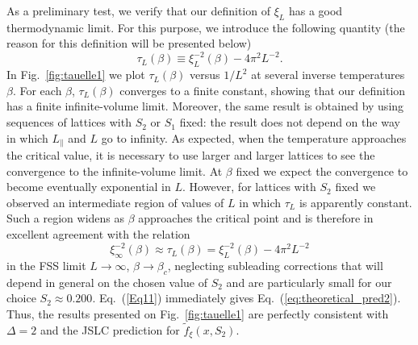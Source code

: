 \documentclass[aps,prl,twocolumn,floatfix,amssymb]{revtex4}
\newcommand{\pa}[1]{#1_{\|}}
\begin{document}
As a preliminary test, we verify that our definition of $\xi_{L}$ has a good 
thermodynamic limit. For this purpose, 
we introduce the following quantity (the reason for this definition 
will be presented below) 
\begin{equation} 
 \label{eq:definition_of_tauelle} 
 \tau_L(\beta) \equiv \xi_L^{-2}(\beta) - 4 \pi^2 L^{-2}. 
\end{equation} 
In Fig.~\ref{fig:tauelle1} 
we plot $\tau_{L}(\beta)$ versus $1/L^{2}$ at 
several inverse temperatures $\beta$. 
For each $\beta$, $\tau_L(\beta)$ converges to a finite 
constant, showing that our definition has a finite 
infinite-volume limit. Moreover, the same result is obtained 
by using sequences of lattices with $S_2$ or $S_1$ fixed: 
the result does not depend on the way in which $\pa{L}$ 
and $L$ go to infinity. As expected, 
when the temperature approaches the critical value, it is necessary to 
use larger and larger lattices to see the convergence to the infinite-volume 
limit. At $\beta$ fixed we expect the convergence to become eventually 
exponential in $L$. However, for lattices with $S_2$ fixed 
we observed an intermediate region of values of $L$ in which $\tau_L$ is 
apparently constant. Such a region widens as $\beta$ approaches the 
critical point and is therefore in excellent agreement with the relation 
\begin{equation} 
 \xi_{\infty}^{-2}(\beta) \approx \tau_L(\beta) = \xi_L^{-2}(\beta) - 4 \pi^2 L^{-2} 
\label{Eq11} 
\end{equation} 
in the FSS limit $L\to \infty$, $\beta\to \beta_c$, neglecting subleading corrections 
that will depend in general on the chosen value of $S_2$ and are particularly 
small for our choice $S_2 \approx 0.200$. 
Eq.~(\ref{Eq11}) immediately gives Eq.~(\ref{eq:theoretical_pred2}). 
Thus, the results presented on Fig.~\ref{fig:tauelle1} 
are perfectly consistent with $\Delta=2$ and the JSLC prediction 
for $\tilde{f}_\xi(x,S_2)$. 
 
\end{document}
